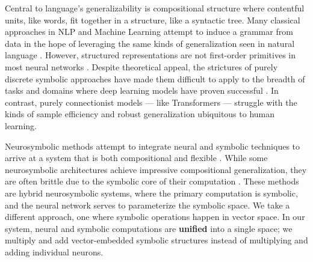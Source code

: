 Central to language's generalizability is compositional structure \citep{partee1995lexical} where contentful units, like words, fit together in a structure, like a syntactic tree. Many classical approaches in NLP and Machine Learning attempt to induce a grammar from data in the hope of leveraging the same kinds of generalization seen in natural language \citep[e.g.][]{ klein2002generative, kim2019compound, steedman1987combinatory}. However, structured representations are not first-order primitives in most neural networks \citep{Marcus2001-MARTAM-10, Smolensky_1988}. Despite theoretical appeal, the strictures of purely discrete symbolic approaches have made them difficult to apply to the breadth of tasks and domains where deep learning models have proven successful \citep{furrer2020compositional}. In contrast, purely connectionist models --- like Transformers \citep{vaswani2017attention} --- struggle with the kinds of sample efficiency and robust generalization ubiquitous to human learning. 

Neurosymbolic methods attempt to integrate neural and symbolic techniques to arrive at a system that is both compositional and flexible \citep{nslr,garcez2008neural,GARNELO201917, Smolensky_1988}. While some neurosymbolic architectures achieve impressive compositional generalization, they are often brittle due to the symbolic core of their computation \citep{shaw-etal-2021-compositional}. These methods are hybrid neurosymbolic systems, where the primary computation is symbolic, and the neural network serves to parameterize the symbolic space. We take a different approach, one where symbolic operations happen in vector space. In our system, neural and symbolic computations are \textbf{unified} into a single space; we multiply and add vector-embedded symbolic structures instead of multiplying and adding individual neurons. %


